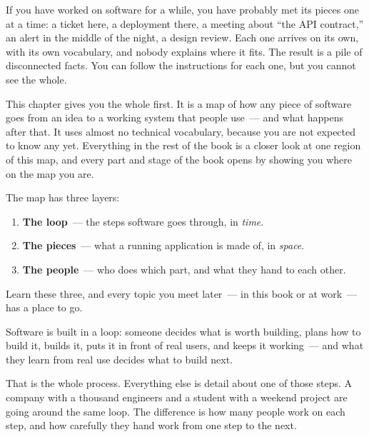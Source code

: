 \label{ch:how-software-gets-built}


\chapterrule

If you have worked on software for a while, you have probably met its pieces one at a time: a ticket here, a deployment there, a meeting about ``the API contract,'' an alert in the middle of the night, a design review. Each one arrives on its own, with its own vocabulary, and nobody explains where it fits. The result is a pile of disconnected facts. You can follow the instructions for each one, but you cannot see the whole.

This chapter gives you the whole first. It is a map of how any piece of software goes from an idea to a working system that people use~--- and what happens after that. It uses almost no technical vocabulary, because you are not expected to know any yet. Everything in the rest of the book is a closer look at one region of this map, and every part and stage of the book opens by showing you where on the map you are.

The map has three layers:

\begin{enumerate}
\def\labelenumi{\arabic{enumi}.}
\tightlist
\item
  \textbf{The loop}~--- the steps software goes through, in \emph{time}.
\item
  \textbf{The pieces}~--- what a running application is made of, in \emph{space}.
\item
  \textbf{The people}~--- who does which part, and what they hand to each other.
\end{enumerate}

\noindent{}Learn these three, and every topic you meet later~--- in this book or at work~--- has a place to go.

\label{how-software-gets-built:the-one-sentence-version}

Software is built in a loop: someone decides what is worth building, plans how to build it, builds it, puts it in front of real users, and keeps it working~--- and what they learn from real use decides what to build next.

That is the whole process. Everything else is detail about one of those steps. A company with a thousand engineers and a student with a weekend project are going around the same loop. The difference is how many people work on each step, and how carefully they hand work from one step to the next.

